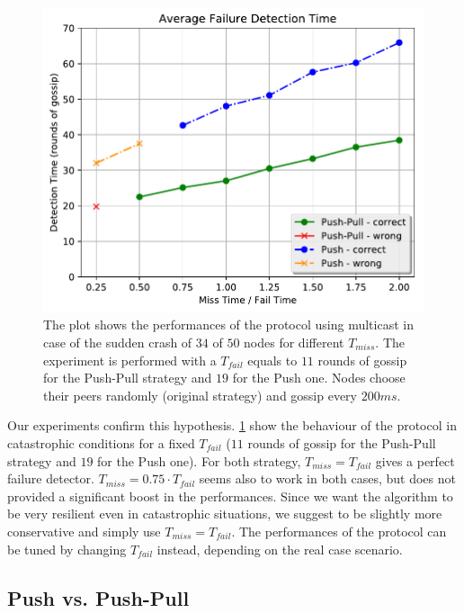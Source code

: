 \begin{figure}[t]
	\centering
	\includegraphics[width=\columnwidth]{figures/n50__miss_times}
	\caption{The plot shows the performances of the protocol using multicast in case of the sudden crash of $34$ of $50$ nodes for different $T_{miss}$. The experiment is performed with a $T_{fail}$ equals to $11$ rounds of gossip for the Push-Pull strategy and $19$ for the Push one. Nodes choose their peers randomly (original strategy) and gossip every $200 \si{ms}$.}
	\label{fig:n50__miss_times}
\end{figure}

Our experiments confirm this hypothesis.
\cref{fig:n50__miss_times} show the behaviour of the protocol in catastrophic conditions for a fixed $T_{fail}$ ($11$ rounds of gossip for the Push-Pull strategy and $19$ for the Push one).
For both strategy, $T_{miss} = T_{fail}$ gives a perfect failure detector.
$T_{miss} = 0.75 \cdot T_{fail}$ seems also to work in both cases, but does not provided a significant boost in the performances.
Since we want the algorithm to be very resilient even in catastrophic situations, we suggest to be slightly more conservative and simply use $T_{miss} = T_{fail}$.
The performances of the protocol can be tuned by changing $T_{fail}$ instead, depending on the real case scenario.


\subsection*{Push vs. Push-Pull}

